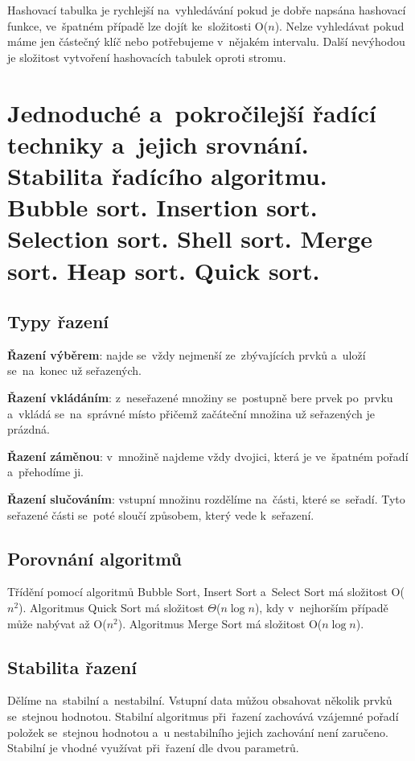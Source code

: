 Hashovací tabulka je rychlejší na~vyhledávání pokud je dobře napsána hashovací funkce, ve~špatném případě lze dojít ke~složitosti O(\( n \)). Nelze vyhledávat pokud máme jen částečný klíč nebo potřebujeme v~nějakém intervalu. Další nevýhodou je složitost vytvoření hashovacích tabulek oproti stromu.

\clearpage
\section{Jednoduché a~pokročilejší řadící techniky a~jejich srovnání. Stabilita řadícího algoritmu. Bubble sort. Insertion sort. Selection sort. Shell sort. Merge sort. Heap sort. Quick sort.}

\subsection{Typy řazení}

\textbf{Řazení výběrem}: najde se~vždy nejmenší ze~zbývajících prvků a~uloží se~na~konec už seřazených.

\textbf{Řazení vkládáním}: z~neseřazené množiny se~postupně bere prvek po~prvku a~vkládá se~na~správné místo přičemž začáteční množina už seřazených je prázdná.

\textbf{Řazení záměnou}: v~množině najdeme vždy dvojici, která je ve~špatném pořadí a~přehodíme ji.

\textbf{Řazení slučováním}: vstupní množinu rozdělíme na~části, které se~seřadí. Tyto seřazené části se~poté sloučí způsobem, který vede k~seřazení.

\subsection{Porovnání algoritmů}

Třídění pomocí algoritmů Bubble Sort, Insert Sort a~Select Sort má složitost O(\( n^2 \)). Algoritmus Quick Sort má složitost \( \Theta \)(\( n\log{n} \)), kdy v~nejhorším případě může nabývat až O(\( n^2 \)). Algoritmus Merge Sort má složitost O(\( n\log{n} \)).

\subsection{Stabilita řazení}

Dělíme na~stabilní a~nestabilní. Vstupní data můžou obsahovat několik prvků se~stejnou hodnotou. Stabilní algoritmus při~řazení zachovává vzájemné pořadí položek se~stejnou hodnotou a~u nestabilního jejich zachování není zaručeno. Stabilní je vhodné využívat při~řazení dle dvou parametrů.

